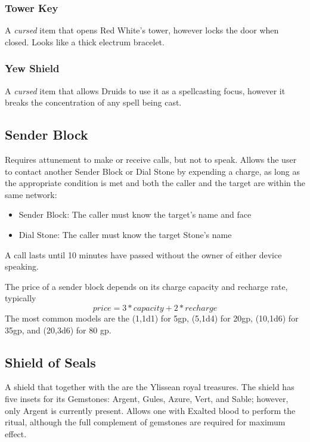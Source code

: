 \subsubsection{Tower Key}
\label{items:redkey}
A \textit{cursed} item that opens Red White's tower, however locks the door when closed. Looks like a thick electrum bracelet.

\subsubsection{Yew Shield}
\label{items:yewshield}
A \textit{cursed} item that allows Druids to use it as a spellcasting focus, however it breaks the concentration of any spell being cast.




\subsection{Sender Block}
\label{items:senderblock}
Requires attunement to make or receive calls, but not to speak. Allows the user to contact another Sender Block or Dial Stone by expending a charge, as long as the appropriate condition is met and both the caller and the target are within the same network:
\begin{itemize}
\item     Sender Block: The caller must know the target's name and face
\item     Dial Stone: The caller must know the target Stone's name
\end{itemize}
A call lasts until 10 minutes have passed without the owner of either device speaking.


The price of a sender block depends on its charge capacity and recharge rate, typically
\[ price = 3 * capacity + 2*recharge \]
The most common models are the (1,1d1) for 5gp, (5,1d4) for 20gp, (10,1d6) for 35gp, and (20,3d6) for 80 gp. 


\subsection{Shield of Seals}
\label{items:fireemblem}
A shield that together with the  are the Ylissean royal treasures. The shield has five insets for its Gemstones: Argent, Gules, Azure, Vert, and Sable; however, only Argent is currently present. Allows one with Exalted blood to perform the  ritual, although the full complement of gemstones are required for maximum effect.


